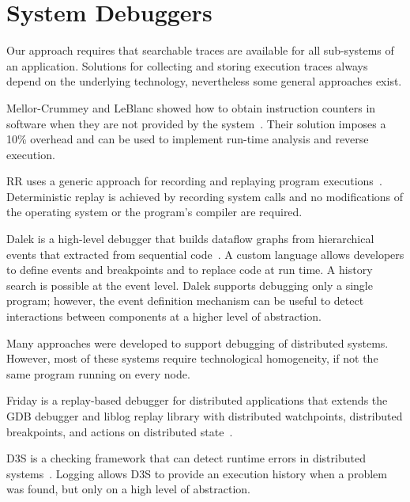 \section{System Debuggers}
\label{sec:rw_system_debugging}

Our approach requires that searchable traces are available for all sub-systems of an application.
Solutions for collecting and storing execution traces always depend on the underlying technology, nevertheless some general approaches exist.

Mellor-Crummey and LeBlanc showed how to obtain instruction counters in software when they are not provided by the system~\cite{mellor-crummey89:a_software_instruction_counter}.
Their solution imposes a 10\% overhead and can be used to implement run-time analysis and reverse execution.

RR uses a generic approach for recording and replaying program executions~\cite{ocallahan17:engineering_record_and_replay}.
Deterministic replay is achieved by recording system calls and no modifications of the operating system or the program's compiler are required.

Dalek is a high-level debugger that builds dataflow graphs from hierarchical events that extracted from sequential code~\cite{olsson91:sequential_debugging_at}.
A custom language allows developers to define events and breakpoints and to replace code at run time.
A history search is possible at the event level.
Dalek supports debugging only a single program; however, the event definition mechanism can be useful to detect interactions between components at a higher level of abstraction.

Many approaches were developed to support debugging of distributed systems.
However, most of these systems require technological homogeneity, if not the same program running on every node.

Friday is a replay-based debugger for distributed applications that extends the GDB debugger and liblog replay library with distributed watchpoints, distributed breakpoints, and actions on distributed state~\cite{geels07:friday_global_comprehension}.


D3S is a checking framework that can detect runtime errors in distributed systems~\cite{liu08:d3s_debugging_deployed_distributed}.
Logging allows D3S to provide an execution history when a problem was found, but only on a high level of abstraction.

